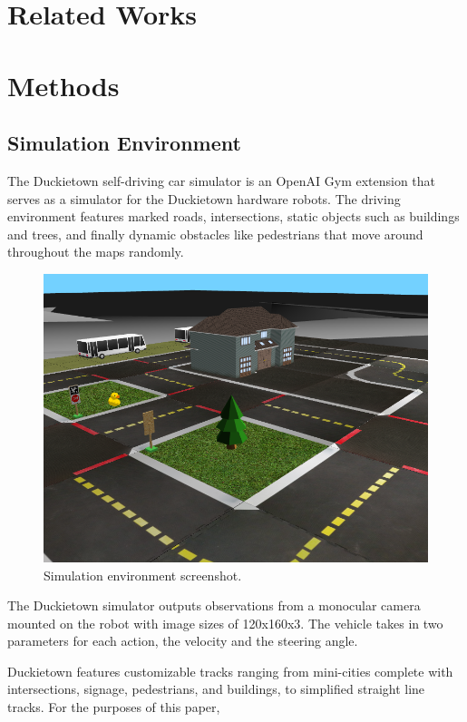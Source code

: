 \documentclass[conference]{IEEEtran}
\begin{document}
\section{Related Works}


\section{Methods}

\subsection{Simulation Environment}
The Duckietown self-driving car simulator is an OpenAI Gym extension that serves as a 
simulator for the Duckietown hardware robots. The driving environment features marked roads, 
intersections, static objects such as buildings and trees, and finally dynamic obstacles 
like pedestrians that move around throughout the maps randomly. \par
\begin{figure}[H]
  \centering
    \includegraphics[scale=0.25]{simplesim_free.png}
  \caption{Simulation environment screenshot.}
\end{figure}
The Duckietown simulator outputs observations from a monocular camera mounted on the robot
with image sizes of 120x160x3. The vehicle takes in two parameters for each action, the velocity
and the steering angle.  \par 
Duckietown features customizable tracks ranging from mini-cities complete with intersections, signage,
pedestrians, and buildings, to simplified straight line tracks. For the purposes of this paper,
\end{document}
